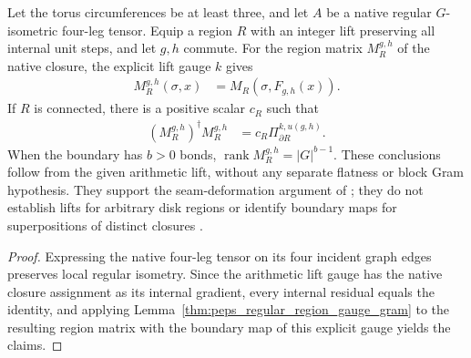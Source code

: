 \begin{lemma}%
    \label{thm:peps_torus_region_integer_lift_gram}
    \leanok
    Let the torus circumferences be at least three, and let $A$ be a
    native regular $G$-isometric four-leg tensor. Equip a region $R$ with
    an integer lift preserving all internal unit steps, and let $g,h$
    commute. For the region matrix $M_R^{g,h}$ of the native
    closure, the explicit lift gauge $k$ gives
    \begin{align}
        M_R^{g,h}(\sigma,x) & =M_R(\sigma,F_{g,h}(x)).
    \end{align}
    If $R$ is connected, there is a positive scalar $c_R$ such that
    \begin{align}
        (M_R^{g,h})^\dagger M_R^{g,h}
         & =c_R\Pi_{\partial R}^{k,u(g,h)}.
    \end{align}
    When the boundary has $b>0$ bonds,
    $\operatorname{rank}M_R^{g,h}=|G|^{b-1}$.
    These conclusions follow from the given arithmetic lift, without
    any separate flatness or block Gram hypothesis. They support the
    seam-deformation argument of \cite[Theorem~6.9]{Schuch2010PEPS};
    they do not establish lifts for arbitrary disk regions or identify
    boundary maps for superpositions of distinct closures
    \cite{gap:rmp_peps_quantum_double_g_isometry}.
\end{lemma}

\begin{proof}\leanok
    Expressing the native four-leg tensor on its four incident graph edges
    preserves local regular isometry. Since the arithmetic lift gauge
    has the native closure assignment as its internal gradient,
    every internal residual equals the identity, and applying
    Lemma~\ref{thm:peps_regular_region_gauge_gram} to the resulting
    region matrix with the boundary map of this explicit gauge yields the claims.
\end{proof}

